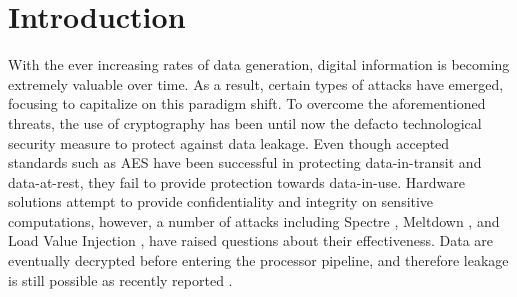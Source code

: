 
% 

\section{Introduction}

With the ever increasing rates of data generation, digital information is becoming extremely valuable over time. As a result, certain types of attacks have emerged, focusing to capitalize on this paradigm shift. To overcome the aforementioned threats, the use of cryptography has been until now the defacto technological security measure to protect against data leakage. Even though accepted standards such as AES have been successful in protecting data-in-transit and data-at-rest, they fail to provide protection towards data-in-use. Hardware solutions \cite{costan2016sgx-explained,trustzone} attempt to provide confidentiality and integrity on sensitive computations, however, a number of attacks \cite{yanga2, hely2012malicious, jin2012exposing, xiao2016hardware, karri2010trustworthy, tsoutsos2013fabrication,adee2008hunt, gross2018ending} including Spectre \cite{Kocher2018spectre}, Meltdown \cite{Lipp2018meltdown}, and Load Value Injection \cite{vanbulck2020lvi}, have raised questions about their effectiveness. Data are eventually decrypted before entering the processor pipeline, and therefore leakage is still possible as recently reported \cite{chen2018sgxpectre}. 





